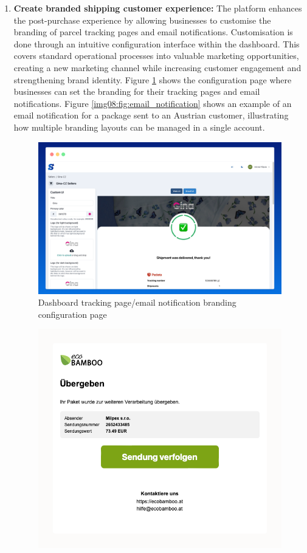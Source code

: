 \begin{enumerate}[label=\bfseries G\arabic*:,leftmargin=*]
    \item \textbf{Create branded shipping customer experience:} The platform enhances the post-purchase experience by allowing businesses to customise the branding of parcel tracking pages and email notifications.
    Customisation is done through an intuitive configuration interface within the dashboard.
    This covers standard operational processes into valuable marketing opportunities, creating a new marketing channel while increasing customer engagement and strengthening brand identity.
    Figure \ref{img08:fig:tracking_config} shows the configuration page where businesses can set the branding for their tracking pages and email notifications. Figure \ref{img08:fig:email_notification} shows an example of an email notification for a package sent to an Austrian customer, illustrating how multiple branding layouts can be managed in a single account.
    \begin{figure}[H]\centering
    \includegraphics[width=140mm]{img/chap08/gui_branding_cinfiguration.png}
    \caption{Dashboard tracking page/email notification branding configuration page}
    \label{img08:fig:tracking_config}
    \end{figure}
    \begin{figure}[H]\centering
    \includegraphics[width=140mm]{img/chap08/email_notification.png}

\end{figure}
\end{enumerate}

